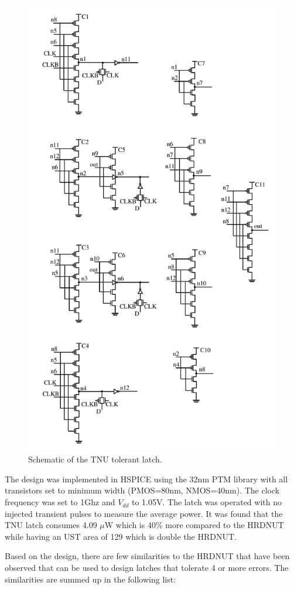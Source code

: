 \begin{figure}[!htbp]
	\centering
	\includegraphics[width=0.75\linewidth]{Figures/TNULatch2}
	\caption{Schematic of the TNU tolerant latch.}
	\label{TNULatch}
\end{figure} 

The design was implemented in HSPICE using the 32nm PTM library with all transistors set to minimum width (PMOS=80nm, NMOS=40nm). The clock frequency was set to 1Ghz and $V_{dd}$ to 1.05V. The latch was operated with no injected transient pulses to measure the average power. It was found that the TNU latch consumes 4.09 $\mu$W which is 40\% more compared to the HRDNUT while having an UST area of 129 which is double the HRDNUT. 

Based on the design, there are few similarities to the HRDNUT that have been observed that can be used to design latches that tolerate 4 or more errors. The similarities are summed up in the following list:

